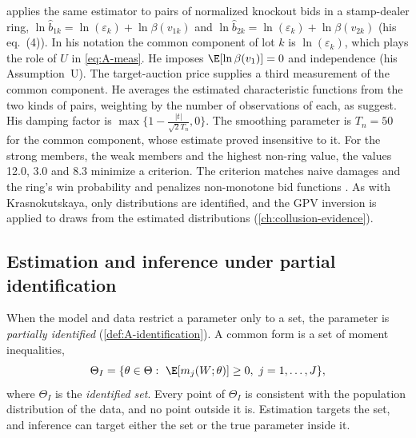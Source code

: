 \citet{Asker2010} applies the same estimator to pairs of normalized knockout bids in a stamp-dealer ring,
$\ln\hat b_{1k}=\ln(\varepsilon_k)+\ln\beta(v_{1k})$ and $\ln\hat b_{2k}=\ln(\varepsilon_k)+\ln\beta(v_{2k})$
(his eq.~(4)). In his notation the common component of lot $k$ is $\ln(\varepsilon_k)$, which plays the
role of $U$ in \eqref{eq:A-meas}. He imposes $\E[\ln\beta(v_1)]=0$ and independence (his Assumption~U).
The target-auction price supplies a third measurement of the common component. He averages the estimated characteristic
functions from the two kinds of pairs, weighting by the number of observations of each, as
\citet{LiVuong1998} suggest. His damping factor is $\max\{1-\frac{|t|}{\sqrt2T_n},0\}$. The smoothing
parameter is $T_n=50$ for the common component, whose estimate proved insensitive to it. For the strong
members, the weak members and the highest non-ring value, the values 12.0, 3.0 and 8.3 minimize a
criterion. The criterion matches naive damages and the ring's win probability and penalizes
non-monotone bid functions \citep[pp.~748--749]{Asker2010}. As with Krasnokutskaya, only distributions are identified, and
the GPV inversion is applied to draws from the estimated distributions (\cref{ch:collusion-evidence}).

\subsection{Estimation and inference under partial identification}\label{sec:A-partialid}

When the model and data restrict a parameter only to a set, the parameter is \emph{partially identified}
(\cref{def:A-identification}). A common form is a set of moment inequalities,
\begin{equation}\label{eq:A-mi}
\Theta_I=\{\theta\in\Theta:\ \E[m_j(W;\theta)]\ge0,\ j=1,\dots,J\},
\end{equation}
where $\Theta_I$ is the \emph{identified set}. Every point of $\Theta_I$ is consistent with the population
distribution of the data, and no point outside it is. Estimation targets the set, and inference can
target either the set or the true parameter inside it.


